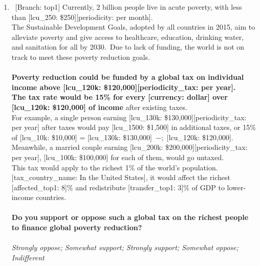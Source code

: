 \begin{enumerate}[resume]
\item ~[Branch: top1] \label{q:top1_tax_support} Currently, 2 billion people live in acute poverty, with less than [lcu\_250: \$250][periodicity: per month].\\The Sustainable Development Goals, adopted by all countries in 2015, aim to alleviate poverty and give access to healthcare, education, drinking water, and sanitation for all by 2030.~Due to lack of funding, the world is not on track to meet these poverty reduction goals.\\\\\textbf{Poverty reduction could be funded by a global tax on individual income above [lcu\_120k: \$120,000][periodicity\_tax: per year].~\\The tax rate would be 15\% for every [currency: dollar] over [lcu\_120k: \$120,000] of income} after existing taxes.~\\For example, a single person earning [lcu\_130k: \$130,000][periodicity\_tax: per year] after taxes would pay [lcu\_1500: \$1,500] in additional taxes, or 15\% of [lcu\_10k: \$10,000] = [lcu\_130k: \$130,000]~$-$;~[lcu\_120k: \$120,000]. Meanwhile, a married couple earning [lcu\_200k: \$200,000][periodicity\_tax: per year], [lcu\_100k: \$100,000] for each of them, would go untaxed.\\This tax would apply to the richest 1\% of the world's population. [tax\_country\_name: In the United States], it would affect the richest [affected\_top1: 8]\% and redistribute [transfer\_top1: 3]\% of GDP to lower-income countries.\\\\\textbf{Do you support or oppose such a global tax on the richest people to finance global poverty reduction?}\\ 
  \\ \textit{Strongly oppose; Somewhat support; Strongly support; Somewhat oppose; Indifferent}


\end{enumerate}
